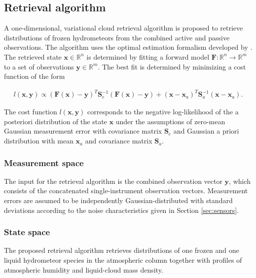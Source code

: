 \documentclass[journal abbreviation, manuscript]{copernicus}
\begin{document}
\subsection{Retrieval algorithm}
\label{sec:orgb528563}

A one-dimensional, variational cloud retrieval algorithm is proposed to
retrieve distributions of frozen hydrometeors from the combined active and
passive observations. The algorithm uses the optimal estimation formalism
developed by \cite{rodgers00}. The retrieved state $\mathbf{x} \in
   \mathbb{R}^n$ is determined by fitting a forward model $\mathbf{F} : \mathbb{R}^n
   \rightarrow \mathbb{R}^m$ to a set of observations $\mathbf{y} \in
   \mathbb{R}^m$. The best fit is determined by minimizing a cost function of
the form

\begin{align}
l(\mathbf{x}, \mathbf{y}) \propto
 \left(\mathbf{F}(\mathbf{x}) - \mathbf{y} \right )^T
  \mathbf{S}_e^{-1} 
  \left ( \mathbf{F}(\mathbf{x}) - \mathbf{y} \right)
+ \left ( \mathbf{x} - \mathbf{x}_a \right )^T
 \mathbf{S}^{-1}_a 
 \left ( \mathbf{x} - \mathbf{x}_a \right ).
\end{align}

The cost function $l(\mathbf{x}, \mathbf{y})$ corresponds to the negative
log-likelihood of the a posteriori distribution of the state $\mathbf{x}$
under the assumptions of zero-mean Gaussian measurement error with covariance
matrix $\mathbf{S}_e$ and Gaussian a priori distribution with mean
$\mathbf{x}_a$ and covariance matrix $\mathbf{S}_a$.

\subsubsection{Measurement space}
\label{sec:orge7dc286}

The input for the retrieval algorithm is the combined observation vector
$\mathbf{y}$, which consists of the concatenated single-instrument observation
vectors. Measurement errors are assumed to be independently Gaussian-distributed
with standard deviations according to the noise characteristics given in Section
\ref{sec:sensors}. 

\subsubsection{State space}
\label{sec:orgae5ee4e}

The proposed retrieval algorithm retrieves distributions of one frozen
and one liquid hydrometeor species in the atmospheric column together with
profiles of atmospheric humidity and liquid-cloud mass density.
\end{document}
